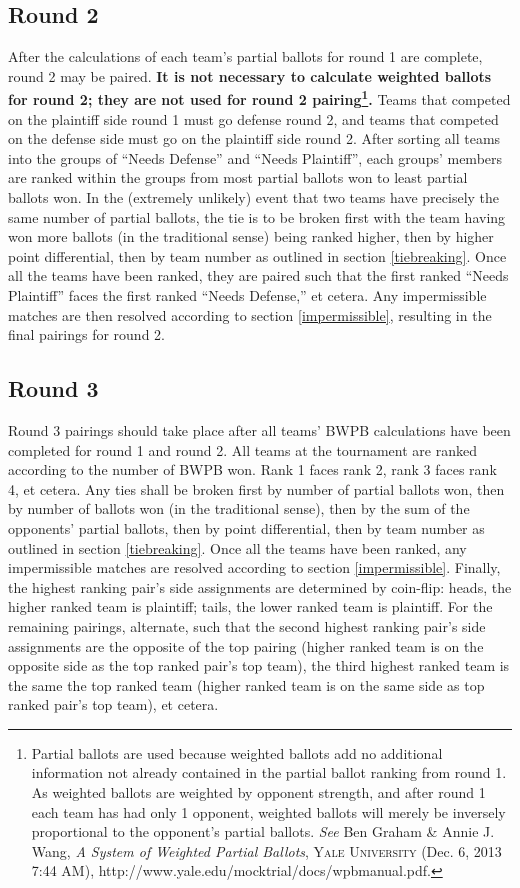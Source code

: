 \documentclass{article}
\begin{document}
\subsection{Round 2}
After the calculations of each team's partial ballots for round 1 are complete, round 2 may be paired.  \textbf{It is not necessary to calculate weighted ballots for round 2; they are not used for round 2 pairing\footnote{Partial ballots are used because weighted ballots add no additional information not already contained in the partial ballot ranking from round 1.  As weighted ballots are weighted by opponent strength, and after round 1 each team has had only 1 opponent, weighted ballots will merely be inversely proportional to the opponent's partial ballots.  \textit{See} Ben Graham \& Annie J. Wang, \textit{A System of Weighted Partial Ballots}, \textsc{Yale University} (Dec. 6, 2013 7:44 AM), http://www.yale.edu/mocktrial/docs/wpbmanual.pdf.}.}  Teams that competed on the plaintiff side round 1 must go defense round 2, and teams that competed on the defense side must go on the plaintiff side round 2.  After sorting all teams into the groups of ``Needs Defense'' and ``Needs Plaintiff'', each groups' members are ranked within the groups from most partial ballots won to least partial ballots won.  In the (extremely unlikely) event that two teams have precisely the same number of partial ballots, the tie is to be broken first with the team having won more ballots (in the traditional sense) being ranked higher, then by higher point differential, then by team number as outlined in section \ref{tiebreaking}.  Once all the teams have been ranked, they are paired such that the first ranked ``Needs Plaintiff'' faces the first ranked ``Needs Defense,'' et cetera.  Any impermissible matches are then resolved according to section \ref{impermissible}, resulting in the final pairings for round 2.
\subsection{Round 3}
Round 3 pairings should take place after all teams' BWPB calculations have been completed for round 1 and round 2.  All teams at the tournament are ranked according to the number of BWPB won.  Rank 1 faces rank 2, rank 3 faces rank 4, et cetera.  Any ties shall be broken first by number of partial ballots won, then by number of ballots won (in the traditional sense), then by the sum of the opponents' partial ballots, then by point differential, then by team number as outlined in section \ref{tiebreaking}.  Once all the teams have been ranked, any impermissible matches are resolved according to section \ref{impermissible}. Finally, the highest ranking pair's side assignments are determined by coin-flip: heads, the higher ranked team is plaintiff; tails, the lower ranked team is plaintiff. For the remaining pairings, alternate, such that the second highest ranking pair's side assignments are the opposite of the top pairing (higher ranked team is on the opposite side as the top ranked pair's top team), the third highest ranked team is the same the top ranked team (higher ranked team is on the same side as top ranked pair's top team), et cetera.
\end{document}
